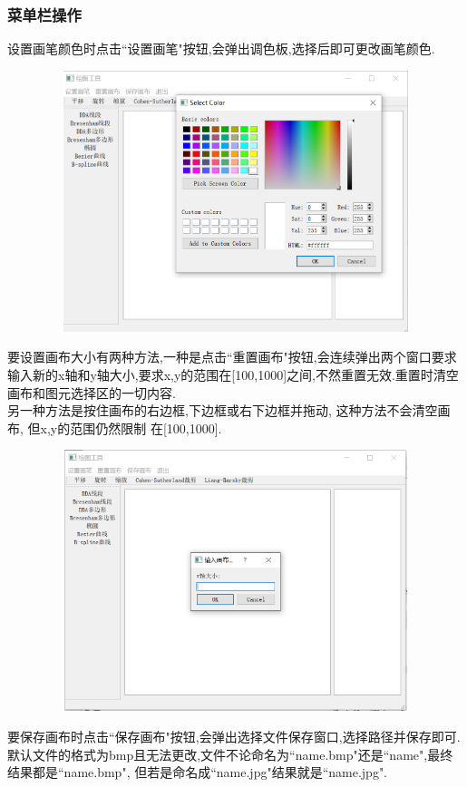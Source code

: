 \documentclass[a4paper,UTF8]{article}
\theoremstyle{definition}
\begin{document}
\subsubsection{菜单栏操作}
设置画笔颜色时点击``设置画笔"按钮,会弹出调色板,选择后即可更改画笔颜色.\\
\begin{figure}[H]
	\includegraphics[width=5in,height=3in]{color.png}
\end{figure}
要设置画布大小有两种方法,一种是点击``重置画布"按钮,会连续弹出两个窗口要求输入新的x轴和y轴大小,要求x,y的范围在[100,1000]之间,不然重置无效.重置时清空画布和图元选择区的一切内容.\\
\indent 另一种方法是按住画布的右边框,下边框或右下边框并拖动, 这种方法不会清空画布, 但x,y的范围仍然限制 在[100,1000].
\begin{figure}[H]
	\includegraphics[width=5in,height=3in]{reset.png}
\end{figure}
要保存画布时点击``保存画布"按钮,会弹出选择文件保存窗口,选择路径并保存即可.默认文件的格式为bmp且无法更改,文件不论命名为``name.bmp"还是``name",最终结果都是``name.bmp", 但若是命名成``name.jpg"结果就是``name.jpg".
\end{document}
